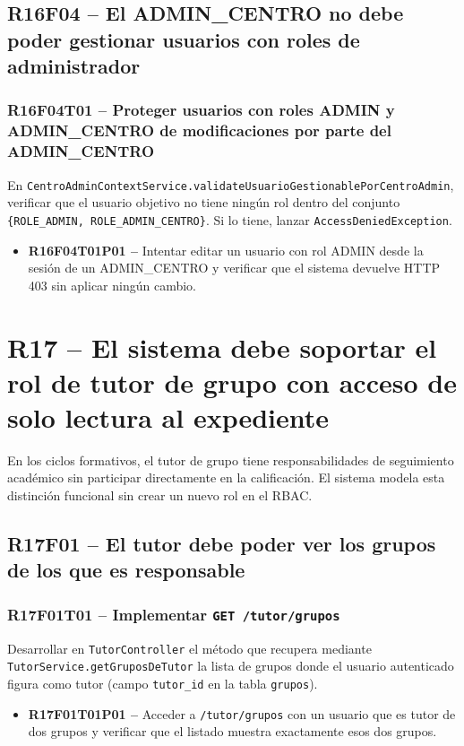 \documentclass[12pt, a4paper]{report}
\begin{document}
\subsection{R16F04 -- El ADMIN\_CENTRO no debe poder gestionar usuarios con roles de administrador}

\subsubsection{R16F04T01 -- Proteger usuarios con roles ADMIN y ADMIN\_CENTRO de modificaciones por parte del ADMIN\_CENTRO}
En \texttt{CentroAdminContextService.validateUsuarioGestionablePorCentroAdmin}, verificar que el usuario objetivo no tiene ningún rol dentro del conjunto \texttt{\{ROLE\_ADMIN, ROLE\_ADMIN\_CENTRO\}}. Si lo tiene, lanzar \texttt{AccessDeniedException}.
\begin{itemize}
  \item \textbf{R16F04T01P01 --} Intentar editar un usuario con rol ADMIN desde la sesión de un ADMIN\_CENTRO y verificar que el sistema devuelve HTTP 403 sin aplicar ningún cambio.
\end{itemize}

\section{R17 -- El sistema debe soportar el rol de tutor de grupo con acceso de solo lectura al expediente}

En los ciclos formativos, el tutor de grupo tiene responsabilidades de seguimiento académico sin participar directamente en la calificación. El sistema modela esta distinción funcional sin crear un nuevo rol en el RBAC.

\subsection{R17F01 -- El tutor debe poder ver los grupos de los que es responsable}

\subsubsection{R17F01T01 -- Implementar \texttt{GET /tutor/grupos}}
Desarrollar en \texttt{TutorController} el método que recupera mediante \texttt{TutorService.getGruposDeTutor} la lista de grupos donde el usuario autenticado figura como tutor (campo \texttt{tutor\_id} en la tabla \texttt{grupos}).
\begin{itemize}
  \item \textbf{R17F01T01P01 --} Acceder a \texttt{/tutor/grupos} con un usuario que es tutor de dos grupos y verificar que el listado muestra exactamente esos dos grupos.
\end{itemize}
\end{document}
